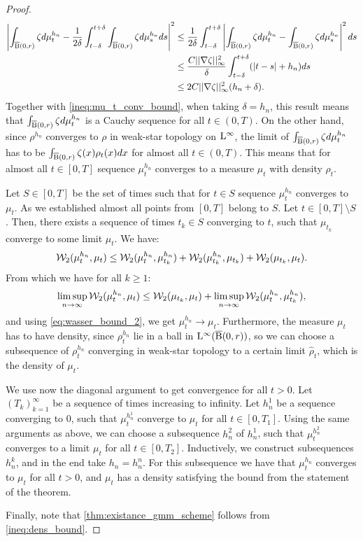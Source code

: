\begin{proof}
\[\begin{aligned}
\left| \int_{\operatorname{\overline{B}}(0,r)} \zeta d\mu_t^{h_n} - \frac{1}{2\delta} \int_{t - \delta}^{t + \delta} \int_{\operatorname{\overline{B}}(0,r)} \zeta d\mu_s^{h_n} ds \right|^2 & \leq \frac{1}{2\delta} \int_{t - \delta}^{t + \delta} \left| \int_{\operatorname{\overline{B}}(0,r)} \zeta d\mu_{t}^{h_n} - \int_{\operatorname{\overline{B}}(0,r)} \zeta d\mu_s^{h_n} \right|^2 ds \\
& \leq \frac{C ||\nabla \zeta||_{\infty}^2}{\delta} \int_{t-\delta}^{t+\delta} (|t-s| +h_n) ds \\
& \leq 2C ||\nabla \zeta||_{\infty}^2 (h_n + \delta).
\end{aligned}
\]
Together with \eqref{ineq:mu_t_conv_bound}, when taking $\delta = h_n$, this result means that $\int_{\operatorname{\overline{B}}(0,r)} \zeta d\mu_t^{h_n}$ is a Cauchy sequence for all $t \in (0, T)$. On the other hand, since $\rho^{h_n}$ converges to $\rho$ in weak-star topology on $\mathrm{L}^{\infty}$, the limit of $\int_{\operatorname{\overline{B}}(0,r)} \zeta d\mu_t^{h_n}$ has to be $\int_{\operatorname{\overline{B}}(0,r)} \zeta(x) \rho_t(x) dx$ for almost all $t \in (0,T)$. This means that for almost all $t \in [0,T]$ sequence $\mu_{t}^{h_n}$ converges to a measure $\mu_t$ with density $\rho_t$.

Let $ S \in [0,T]$ be the set of times such that for $t \in S$ sequence $\mu_{t}^{h_n}$ converges to $\mu_t$. As we established almost all points from $[0,T]$ belong to $S$. Let $ t \in [0,T] \setminus S$. Then, there exists a sequence of times $t_k \in S$ converging to $t$, such that $\mu_{t_k}$ converge to some limit $\mu_t$. We have:
\[
{\cal W}_2(\mu_t^{h_n}, \mu_t) \leq {\cal W}_2(\mu_{t}^{h_n}, \mu_{t_k}^{h_n}) + {\cal W}_2(\mu_{t_k}^{h_n}, \mu_{t_k}) + {\cal W}_2(\mu_{t_k}, \mu_t).
\]
From which we have for all $k \geq 1$:
\[
\limsup_{n \rightarrow \infty} {\cal W}_2(\mu_{t}^{h_n}, \mu_t) \leq {\cal W}_2(\mu_{t_k}, \mu_t) + \limsup_{n\rightarrow \infty} {\cal W}_2(\mu_t^{h_n}, \mu_{t_k}^{h_n}),
\]
and using \eqref{eq:wasser_bound_2}, we get $\mu_{t}^{h_n} \rightarrow \mu_t$. Furthermore, the measure $\mu_t$ has to have density, since $\rho_{t}^{h_n}$ lie in a ball in $\mathrm{L}^{\infty}(\operatorname{\overline{B}}(0,r))$, so we can choose a subsequence of $\rho_t^{h_n}$ converging in weak-star topology to a certain limit $\hat{\rho}_t$, which is the density of $\mu_t$. 

We use now the diagonal argument to get convergence for all $t >0$. Let $(T_k)_{k=1}^{\infty}$ be a sequence of times increasing to infinity. Let $h_{n}^1$ be a sequence converging to $0$, such that $\mu_t^{h_n^1}$ converge to $\mu_t$ for all $t \in [0, T_1]$. Using the same arguments as above, we can choose a subsequence $h_n^2$ of $h_n^1$, such that $\mu_{t}^{h_n^2}$ converges to a limit $\mu_t$ for all $t \in [0, T_2]$. Inductively, we construct subsequences $h_{n}^k$, and in the end take $h_n = h_n^n$. For this subsequence we have that $\mu_t^{h_n}$ converges to $\mu_t$ for all $t > 0$, and $\mu_t$ has a density satisfying the bound from the statement of the theorem.

Finally, note that \eqref{thm:existance_gmm_scheme} follows from \eqref{ineq:dens_bound}.
\end{proof}

